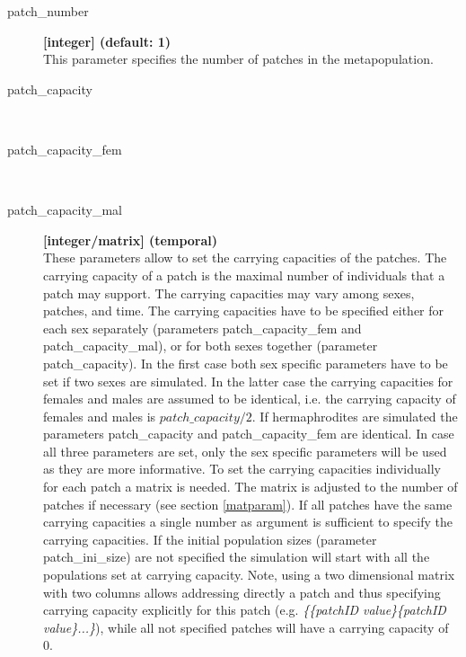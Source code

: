 \documentclass[letterpaper,12pt,oneside]{book}
\begin{document}
\begin{description}
\item[patch\_number] \textbf{[integer] (default: 1)}\\ 
This parameter specifies the number of patches in the metapopulation.

\item[patch\_capacity]\hspace*{\fill}\\
\vspace{-9mm}
\item[patch\_capacity\_fem]\hspace*{\fill}\\
\vspace{-9mm}
\item[patch\_capacity\_mal]\textbf{[integer/matrix] (temporal)}\\
These parameters allow to set the carrying capacities of the patches. The carrying capacity of a patch is the maximal number of individuals that a patch may support. The carrying capacities may vary among sexes, patches, and time. The carrying capacities have to be specified either for each sex separately (parameters \textsf{patch\_capacity\_fem} and \textsf{patch\_capacity\_mal}), or for both sexes together (parameter \textsf{patch\_capacity}). In the first case both sex specific parameters have to be set if two sexes are simulated. In the latter case the carrying capacities for females and males are assumed to be identical, i.e. the carrying capacity of females and males is $patch\_capacity/2$. If hermaphrodites are simulated the parameters \textsf{patch\_capacity} and \textsf{patch\_capacity\_fem} are identical. In case all three parameters are set, only the sex specific parameters will be used as they are more informative. To set the carrying capacities individually for each patch a matrix is needed. The matrix is adjusted to the number of patches if necessary (see section \ref{matparam}). If all patches have the same carrying capacities a single number as argument is sufficient to specify the carrying capacities. If the initial population sizes (parameter \textsf{patch\_ini\_size}) are not specified the simulation will start with all the populations set at carrying capacity. Note, using a two dimensional matrix with two columns allows addressing directly a patch and thus specifying carrying capacity explicitly for this patch (e.g. \textit{\{\{patchID value\}\{patchID value\}...\}}), while all not specified patches will have a carrying capacity of 0. 


\end{description}
\end{document}
